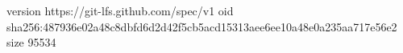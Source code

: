 version https://git-lfs.github.com/spec/v1
oid sha256:487936e02a48c8dbfd6d2d42f5cb5acd15313aee6ee10a48e0a235aa717e56e2
size 95534
